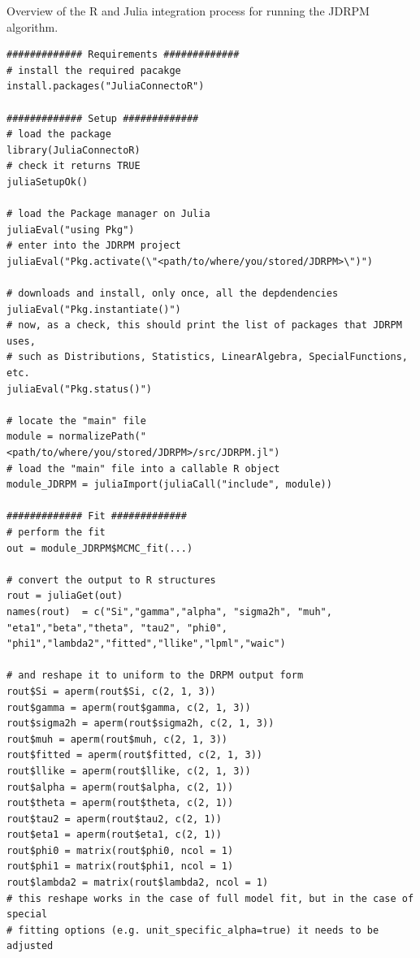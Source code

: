 \documentclass[12pt,	%
	a4paper,		%
	twoside,		%
	openright,		%
	titlepage,%
	]{book}
\theoremstyle{definition}
\newcommand{\mjline}[1]{\texttt{#1}}
\newenvironment{code}{\captionsetup{type=listing}}{}
\begin{document}
\begin{code}
\caption[Using \mjline{JDRPM} from R.]{Overview of the R and Julia integration process for running the JDRPM algorithm.}
\begin{verbatim}
############# Requirements #############
# install the required pacakge
install.packages("JuliaConnectoR")

############# Setup #############
# load the package
library(JuliaConnectoR)
# check it returns TRUE
juliaSetupOk() 

# load the Package manager on Julia
juliaEval("using Pkg")
# enter into the JDRPM project
juliaEval("Pkg.activate(\"<path/to/where/you/stored/JDRPM>\")")

# downloads and install, only once, all the depdendencies
juliaEval("Pkg.instantiate()") 
# now, as a check, this should print the list of packages that JDRPM uses,
# such as Distributions, Statistics, LinearAlgebra, SpecialFunctions, etc.
juliaEval("Pkg.status()") 

# locate the "main" file
module = normalizePath("<path/to/where/you/stored/JDRPM>/src/JDRPM.jl") 
# load the "main" file into a callable R object
module_JDRPM = juliaImport(juliaCall("include", module)) 

############# Fit #############
# perform the fit
out = module_JDRPM$MCMC_fit(...) 

# convert the output to R structures
rout = juliaGet(out)
names(rout)  = c("Si","gamma","alpha", "sigma2h", "muh", "eta1","beta","theta", "tau2", "phi0", "phi1","lambda2","fitted","llike","lpml","waic")

# and reshape it to uniform to the DRPM output form
rout$Si = aperm(rout$Si, c(2, 1, 3))
rout$gamma = aperm(rout$gamma, c(2, 1, 3))
rout$sigma2h = aperm(rout$sigma2h, c(2, 1, 3))
rout$muh = aperm(rout$muh, c(2, 1, 3))
rout$fitted = aperm(rout$fitted, c(2, 1, 3))
rout$llike = aperm(rout$llike, c(2, 1, 3))
rout$alpha = aperm(rout$alpha, c(2, 1))
rout$theta = aperm(rout$theta, c(2, 1))
rout$tau2 = aperm(rout$tau2, c(2, 1))
rout$eta1 = aperm(rout$eta1, c(2, 1))
rout$phi0 = matrix(rout$phi0, ncol = 1)
rout$phi1 = matrix(rout$phi1, ncol = 1)
rout$lambda2 = matrix(rout$lambda2, ncol = 1)
# this reshape works in the case of full model fit, but in the case of special
# fitting options (e.g. unit_specific_alpha=true) it needs to be adjusted
\end{verbatim}
\label{julia connector instructions}
\end{code}
\end{document}
